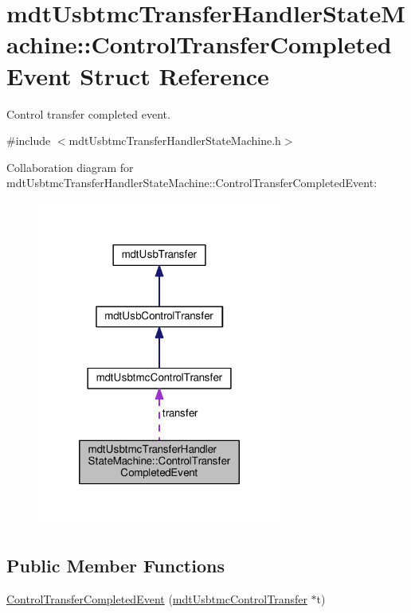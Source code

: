 \hypertarget{structmdt_usbtmc_transfer_handler_state_machine_1_1_control_transfer_completed_event}{\section{mdt\-Usbtmc\-Transfer\-Handler\-State\-Machine\-:\-:Control\-Transfer\-Completed\-Event Struct Reference}
\label{structmdt_usbtmc_transfer_handler_state_machine_1_1_control_transfer_completed_event}
}


Control transfer completed event.  




{\ttfamily \#include $<$mdt\-Usbtmc\-Transfer\-Handler\-State\-Machine.\-h$>$}



Collaboration diagram for mdt\-Usbtmc\-Transfer\-Handler\-State\-Machine\-:\-:Control\-Transfer\-Completed\-Event\-:
\nopagebreak
\begin{figure}[H]
\begin{center}
\leavevmode
\includegraphics[width=228pt]{structmdt_usbtmc_transfer_handler_state_machine_1_1_control_transfer_completed_event__coll__graph}
\end{center}
\end{figure}
\subsection*{Public Member Functions}
\begin{DoxyCompactItemize}
\item 
\hyperlink{structmdt_usbtmc_transfer_handler_state_machine_1_1_control_transfer_completed_event_a096399469c22ab81837a459d7396a2d0}{Control\-Transfer\-Completed\-Event} (\hyperlink{classmdt_usbtmc_control_transfer}{mdt\-Usbtmc\-Control\-Transfer} $\ast$t)
\end{DoxyCompactItemize}
